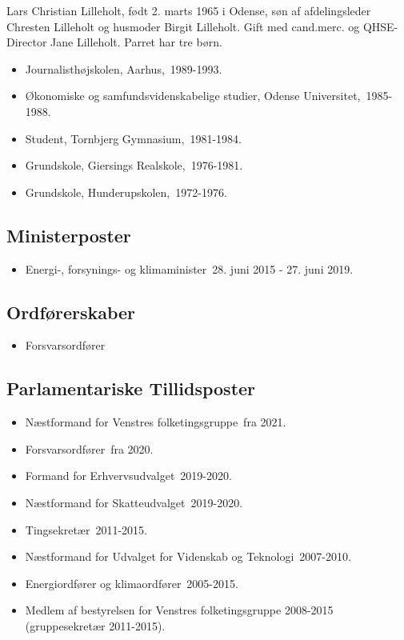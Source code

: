 \documentclass[11pt, a4paper]{awesome-cv}
\begin{document}
\makecvheader[R]
\makelettertitle
\begin{cvletter}
Lars Christian Lilleholt, født 2. marts 1965 i Odense, søn af afdelingsleder Chresten Lilleholt og husmoder Birgit Lilleholt. Gift med cand.merc. og QHSE-Director Jane Lilleholt. Parret har tre børn.

\begin{itemize}
\item Journalisthøjskolen, Aarhus, 1989-1993.
\item Økonomiske og samfundsvidenskabelige studier, Odense Universitet, 1985-1988.
\item Student, Tornbjerg Gymnasium, 1981-1984.
\item Grundskole, Giersings Realskole, 1976-1981.
\item Grundskole, Hunderupskolen, 1972-1976.
\end{itemize}
\subsection*{Ministerposter}
\begin{itemize}
\item Energi-, forsynings- og klimaminister 28. juni 2015 - 27. juni 2019.
\end{itemize}
\subsection*{Ordførerskaber}
\begin{itemize}
\item Forsvarsordfører
\end{itemize}
\subsection*{Parlamentariske Tillidsposter}
\begin{itemize}
\item Næstformand for Venstres folketingsgruppe fra 2021.
\item Forsvarsordfører fra 2020.
\item Formand for Erhvervsudvalget 2019-2020.
\item Næstformand for Skatteudvalget 2019-2020.
\item Tingsekretær 2011-2015.
\item Næstformand for Udvalget for Videnskab og Teknologi 2007-2010.
\item Energiordfører og klimaordfører 2005-2015.
\item Medlem af bestyrelsen for Venstres folketingsgruppe 2008-2015 (gruppesekretær 2011-2015).
\end{itemize}

\end{cvletter}
\end{document}
